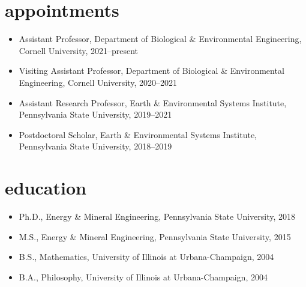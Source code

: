 \documentclass[11pt,article,oneside]{memoir}
\begin{document}

\section{appointments}

\mbox{}\vspace{-\dimexpr\baselineskip\relax}

\begin{itemize}[label={}]

\item Assistant Professor, Department of Biological \& Environmental Engineering, Cornell University, 2021--present

\item Visiting Assistant Professor, Department of Biological \& Environmental Engineering, Cornell University, 2020--2021

\item Assistant Research Professor, Earth \& Environmental Systems Institute, Pennsylvania State University, 2019--2021

\item Postdoctoral Scholar, Earth \& Environmental Systems Institute, Pennsylvania State University, 2018--2019

\end{itemize}


\section{education}

\mbox{}\vspace{-\dimexpr\baselineskip\relax}

\begin{itemize}[label={}]

\item Ph.D., Energy \& Mineral Engineering, Pennsylvania State University, 2018

\item M.S., Energy \& Mineral Engineering, Pennsylvania State University, 2015

\item B.S., Mathematics, University of Illinois at Urbana-Champaign, 2004

\item B.A., Philosophy, University of Illinois at Urbana-Champaign, 2004

\end{itemize}
\end{document}
